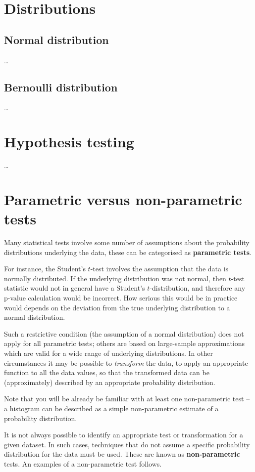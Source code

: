 \section{Distributions}

\subsection{Normal distribution}

\ldots

\subsection{Bernoulli distribution}

\ldots

\section{Hypothesis testing}

\ldots

\section{Parametric versus non-parametric tests}

Many statistical tests involve some number of assumptions about the probability distributions underlying the data, these can be categorised as \textbf{parametric tests}.

For instance, the Student's $t$-test involves the assumption that the data is normally distributed.
If the underlying distribution was not normal, then $t$-test statistic would not in general have a Student's $t$-distribution, and therefore any p-value calculation would be incorrect.
How serious this would be in practice would depends on the deviation from the true underlying distribution to a normal distribution.

Such a restrictive condition (the assumption of a normal distribution) does not apply for all parametric tests; others are based on large-sample approximations which are valid for a wide range of underlying distributions.
In other circumstances it may be possible to \emph{transform} the data, to apply an appropriate function to all the data values, so that the transformed data can be (approximately) described by an appropriate probability distribution.

\begin{marginnoteblock}
  Note that you will be already be familiar with at least one non-parametric test -- a histogram can be described as a simple non-parametric estimate of a probability distribution.  
\end{marginnoteblock}
It is not always possible to identify an appropriate test or transformation for a given dataset.  
In such cases, techniques that do not assume a specific probability distribution for the data must be used.
These are known as \textbf{non-parametric} tests.
An examples of a non-parametric test follows.

